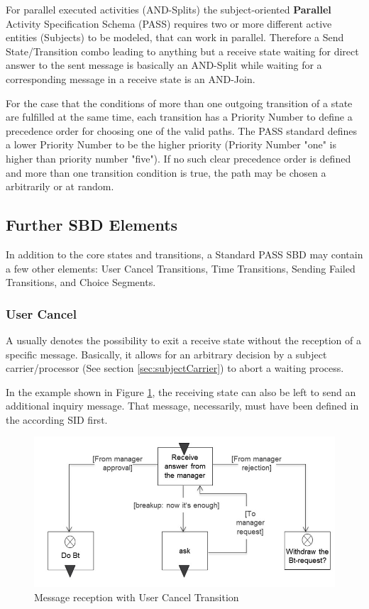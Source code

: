For parallel executed activities (AND-Splits) the subject-oriented \textbf{Parallel} Activity Specification Schema (PASS) requires two or more different active entities (Subjects) to be modeled, that can work in parallel. Therefore a Send State/Transition combo leading to anything but a receive state waiting for direct answer to the sent message is basically an AND-Split while waiting for a corresponding message in a receive state is an AND-Join. 

For the case that the conditions of more than one outgoing transition of a state are fulfilled at the same time, each transition has a Priority Number to define a precedence order for choosing one of the valid paths. The PASS standard defines a lower Priority Number to be the higher priority (Priority Number "one" is higher than priority number "five"). If no such clear precedence order is defined and more than one transition condition is true, the path may be chosen a arbitrarily or at random.

\subsection{Further SBD Elements}

In addition to the core states and transitions, a Standard PASS SBD may contain a few other elements: User Cancel Transitions, Time Transitions, Sending Failed Transitions, and Choice Segments. 

\subsubsection{User Cancel}

A  usually denotes the possibility to exit a receive state without the reception of a specific message. Basically, it allows for an arbitrary decision by a subject carrier/processor (See section \ref{sec:subjectCarrier}) to abort a waiting process.

In the example shown in Figure \ref{fig:receivestatebreak}, the receiving state can also be left to send an additional inquiry message. That message, necessarily, must have been defined in the according SID first.

\begin{figure}[htbp]
	\centering
	\includegraphics[width=0.7\linewidth]{Figures/Ontology/SubjectBehavior/ReceiveStateBreak}
	\caption[Message reception with User Cancel Transition]{Message reception with User Cancel Transition}
	\label{fig:receivestatebreak}
\end{figure}

